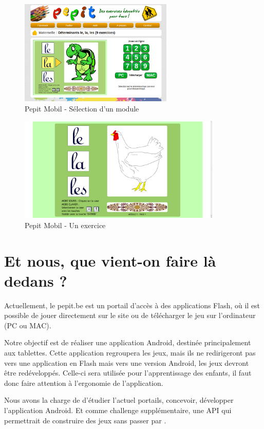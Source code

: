 \begin{figure}[H]
\begin{center}
\includegraphics[height=5cm]{images/pepit_be_modules}
\end{center}
\caption{Pepit Mobil - Sélection d'un module}
\label{Pepit Mobil - Sélection d'un module}
\end{figure}

\begin{figure}[H]
\begin{center}
\includegraphics[height=5cm]{images/pepit_be_practice}
\end{center}
\caption{Pepit Mobil - Un exercice}
\label{Pepit Mobil - Un exercice}
\end{figure}

\section{Et nous, que vient-on faire là dedans ?}
Actuellement, le pepit.be est un portail d'accès à des applications Flash, où il est possible de jouer directement sur le site ou de télécharger le jeu sur l'ordinateur (PC ou MAC).


Notre objectif est de réaliser une application Android, destinée principalement aux tablettes. Cette application regroupera les jeux, mais ils ne redirigeront pas vers une application en Flash mais vers une version Android, les jeux devront être redéveloppés. Celle-ci sera utilisée pour l'apprentissage des enfants, il faut donc faire attention à l'ergonomie de l'application.


Nous avons la charge de d'étudier l'actuel portails, concevoir, développer l'application Android. Et comme challenge supplémentaire, une API qui permettrait de construire des jeux sans passer par \java{}.